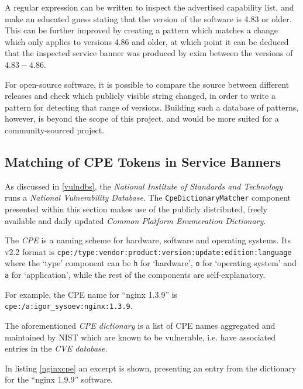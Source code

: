 \documentclass[a4paper,12pt]{article}
\begin{document}
	A regular expression can be written to inspect the advertised capability list, and make an educated guess stating that the version of the software is 4.83 or older. This can be further improved by creating a pattern which matches a change which only applies to versions 4.86 and older, at which point it can be deduced that the inspected service banner was produced by exim between the versions of $4.83-4.86$.
	
	For open-source software, it is possible to compare the source between different releases and check which publicly visible string changed, in order to write a pattern for detecting that range of versions. Building such a database of patterns, however, is beyond the scope of this project, and would be more suited for a community-sourced project.
	
\subsection{Matching of CPE Tokens in Service Banners} \label{matchcpe}
 

	As discussed in \ref{vulndbs}, the \textit{National Institute of Standards and Technology} runs a \textit{National Vulnerability Database}. The \texttt{CpeDictionaryMatcher} component presented within this section makes use of the publicly distributed, freely available and daily updated \textit{Common Platform Enumeration Dictionary}.
	
	The \textit{CPE} is a naming scheme for hardware, software and operating systems\cite{cpe22}. Its v2.2 format is \texttt{cpe:/type:vendor:product:version:update:edition:language} where the `type' component can be \texttt{h} for `hardware', \texttt{o} for `operating system' and \texttt{a} for `application', while the rest of the components are self-explanatory.
	
	For example, the CPE name for ``nginx 1.3.9'' is \texttt{cpe:/a:igor_sysoev:nginx:1.3.9}.
	
	The aforementioned \textit{CPE dictionary} is a list of CPE names aggregated and maintained by NIST which are known to be vulnerable, i.e. have associated entries in the \textit{CVE database}.
	
	In listing \ref{nginxcpe} an excerpt is shown, presenting an entry from the dictionary for the ``nginx 1.9.9'' software.
	
\end{document}
